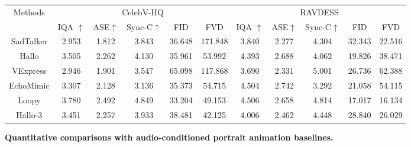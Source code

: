 \begin{figure}
    \small
\captionsetup{type=table}
    \centering
        {
            \caption{\textbf{Quantitative comparisons with audio-conditioned portrait animation baselines.}}
  \label{Tab1}
  \centering
  \begin{tabular}{ccccccccccc}
    \toprule
     \multirow{2}{*}{Methods} & \multicolumn{5}{c}{CelebV-HQ} & \multicolumn{5}{c}{RAVDESS} \\ %
     \cmidrule(l){2-6}
     \cmidrule(l){7-11}
     &IQA $\uparrow$ & ASE$\uparrow$ & Sync-C$\uparrow$ & FID & FVD &IQA $\uparrow$ & ASE$\uparrow$ & Sync-C$\uparrow$ & FID & FVD  \\ %
    \midrule
         SadTalker \cite{zhang2023sadtalker} & 2.953 & 1.812 & 3.843 & 36.648 & 171.848 & 3.840 & 2.277 & 4.304 & 32.343 & 22.516  \\ %
         Hallo \cite{xu2024hallo} & 3.505 & 2.262 & 4.130 & 35.961 & 53.992 & 4.393 & 2.688 & 4.062 &19.826 & 38.471\\ %
         VExpress \cite{wang2024v} & 2.946 & 1.901 &3.547 & 65.098 & 117.868 & 3.690 & 2.331 & 5.001 & 26.736 &  62.388 \\ %
         EchoMimic \cite{chen2024echomimic} & 3.307 & 2.128 & 3.136 & 35.373 & 54.715 & 4.504 & 2.742 & 3.292 & 21.058 & 54.115 \\ %
    Loopy \cite{jiang2024loopy} & 3.780 & 2.492 & 4.849 & 33.204 & 49.153 & 4.506 & 2.658 & 4.814 & 17.017 & 16.134 \\ %
    Hallo-3 \cite{hallo3} &
    3.451 & 2.257 & 3.933 & 38.481 & 42.125 & 4.006 & 2.462 & 4.448 & 28.840 & 26.029\\ %
    

\end{tabular}}
\end{figure}
